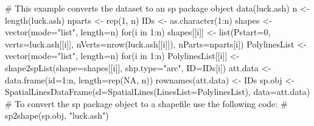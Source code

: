 \begin{Examples}
\begin{ExampleCode}
# This example converts the dataset to an sp package object
data(luck.ash)
n <- length(luck.ash)
nparts <- rep(1, n)
IDs <- as.character(1:n)
shapes <- vector(mode="list", length=n)
for(i in 1:n) {
   shapes[[i]] <- list(Pstart=0, verts=luck.ash[[i]], 
      nVerts=nrow(luck.ash[[i]]), nParts=nparts[i])
}
PolylinesList <- vector(mode="list", length=n)
for(i in 1:n) {
  PolylinesList[[i]] <- shape2spList(shape=shapes[[i]], shp.type="arc",
     ID=IDs[i])
}
att.data <- data.frame(id=1:n, length=rep(NA, n))
rownames(att.data) <- IDs
sp.obj <- SpatialLinesDataFrame(sl=SpatialLines(LinesList=PolylinesList),
   data=att.data)
# To convert the sp package object to a shapefile use the following code: 
# sp2shape(sp.obj, "luck.ash")
\end{ExampleCode}
\end{Examples}

